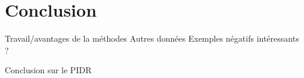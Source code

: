 \chapter{Conclusion}

Travail/avantages de la méthodes
Autres données
Exemples négatifs intéressants ?

Conclusion sur le PIDR